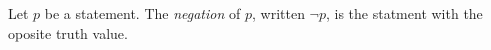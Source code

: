 \guard





\begin{defn}
\label{defn:negationOfStatement}
  Let $p$ be a statement.
  The \emph{negation} of $p$, written $\neg p$, is the statment with the oposite truth value.
\end{defn}

